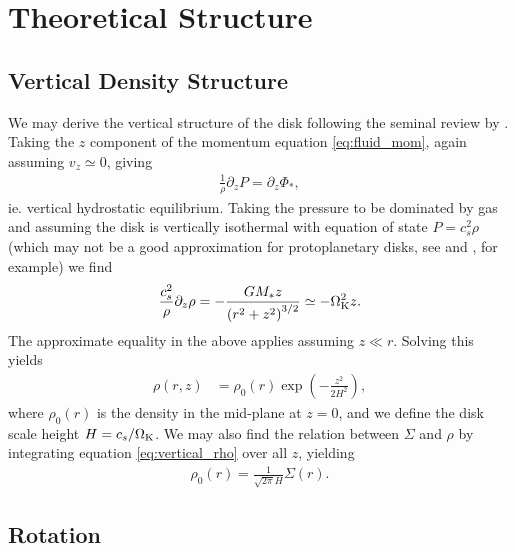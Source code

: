 \section{Theoretical Structure}


\subsection{Vertical Density Structure}

We may derive the vertical structure of the disk following the seminal review by \citet{pringle1981}. Taking the $z$ component of the momentum equation \ref{eq:fluid_mom}, again assuming $v_z \simeq 0$, giving
\begin{align}
    \frac{1}{\rho} \partial_z P = \partial_z \Phi_*,
\end{align}
ie. vertical hydrostatic equilibrium. 
Taking the pressure to be dominated by gas and assuming the disk is vertically isothermal with equation of state $P=c_s^2 \rho$ (which may not be a good approximation for protoplanetary disks, see \citet{pinte2018} and \citet{calahan2021}, for example) we find
\begin{align}
    \frac{c_s^2}{\rho} \partial_z \rho = - \frac{G M_* z}{\left(r^2 + z^2\right)^{3/2}} \simeq - \Omega_{\rm K}^2 z.
\end{align}
The approximate equality in the above applies assuming $z \ll r$. 
Solving this yields
\begin{align}
    \rho(r,z) &= \rho_0(r) \exp{\left( -\frac{z^2}{2 H^2} \right)}, \label{eq:vertical_rho}
\end{align}
where $\rho_0(r)$ is the density in the mid-plane at $z=0$, and we define the disk scale height $H = c_s/\Omega_{\rm K}$.
We may also find the relation between $\Sigma$ and $\rho$ by integrating equation \ref{eq:vertical_rho} over all $z$, yielding
\begin{align}
    \rho_0(r) = \frac{1}{\sqrt{2\pi} H} \Sigma(r). \label{eq:surf_dens_to_dens}
\end{align}

\subsection{Rotation}

